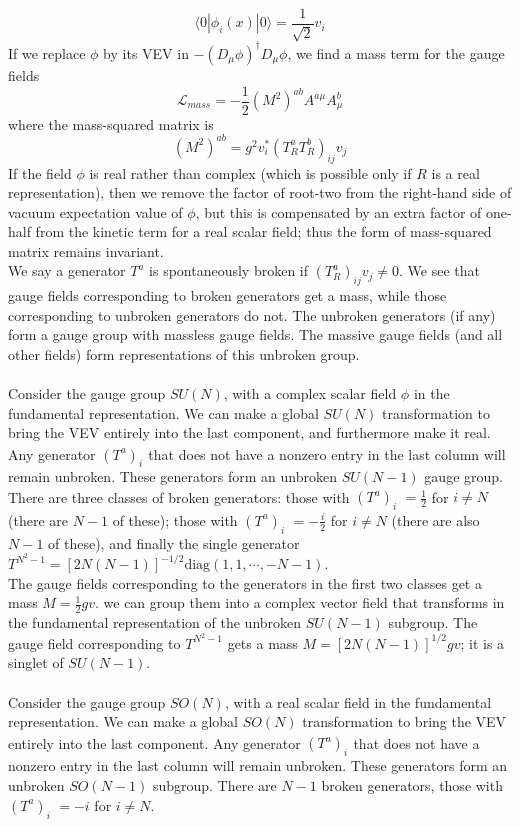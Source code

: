 \[\langle 0 | \phi_i(x) | 0 \rangle = \frac{1}{\sqrt{2}}v_i\]
If we replace $\phi$ by its VEV in $-(D_{\mu}\phi)^{\dagger}D_{\mu}\phi$, we find a mass term for the gauge fields
\[\mathcal{L}_{mass} = - \frac{1}{2}(M^2)^{ab}A^{a\mu}A^b_{\mu}\]
where the mass-squared matrix is
\[(M^2)^{ab} = g^2 v_i^* (T^a_R T^b_R)_{ij}v_j \]
If the field $\phi$ is real rather than complex (which is possible only if $R$ is a real representation), then we remove the factor of root-two from the right-hand side of vacuum expectation value of $\phi$, but this is compensated by an extra factor of one-half from the kinetic term for a real scalar field; thus the form of mass-squared matrix remains invariant.
\\
We say a generator $T^a$ is spontaneously broken if $(T^a_R)_{ij}v_j \neq 0$. We see that gauge fields corresponding to broken generators get a mass, while those corresponding to unbroken generators do not. The unbroken generators (if any) form a gauge group with massless gauge fields. The massive gauge fields (and all other fields) form
representations of this unbroken group.
\\ \\
Consider the gauge group $SU(N)$, with a complex scalar field $\phi$ in the fundamental representation. We can make a global $SU(N)$ transformation to bring the VEV entirely into the last component, and furthermore make it real. 
Any generator $(T^a)_{i}^{\phantom{j}}$ that does not have a nonzero entry in the last column will remain unbroken. These generators form an unbroken $SU(N-1)$ gauge group. There are three classes of broken generators: those with $(T^a)_{i}^{\phantom{N}} = \frac{1}{2}$  for $i \neq N$ (there are $N-1$ of these); those with
$(T^a)_{i}^{\phantom{N}} = -\frac{i}{2}$  for $i \neq N$ (there are also $N - 1$ of these), and finally the single
generator $T^{N^2 - 1} = [2N(N-1)]^{-1/2} \mathrm{diag}(1,1,\cdots,-N-1)$. 
\\
The gauge fields corresponding to the generators in the first two classes get a mass $M = \frac{1}{2}gv$.
we can group them into a complex vector field that transforms in the fundamental representation of the unbroken $SU(N-1)$ subgroup. The gauge field corresponding to $T^{N^2-1}$ gets a mass $M = [2N(N-1)]^{1/2}gv$; it is a singlet of $SU(N-1)$.
\\ \\
Consider the gauge group $SO(N)$, with a real scalar field in the fundamental representation. We can make a global $SO(N)$ transformation to bring the VEV entirely into the last component. Any generator $(T^a)_{i}^{\phantom{j}}$ that does not have a nonzero entry in the last column will remain unbroken. These generators form an unbroken $SO(N-1)$ subgroup. There are $N - 1$ broken generators, those with $(T^a)_{i}^{\phantom{N}} = -i$  for $i \neq N$. 
